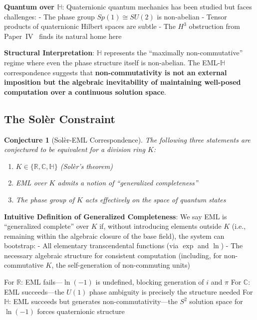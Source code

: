 \documentclass[11pt]{article}
\newtheorem{conjecture}[theorem]{Conjecture}
\providecommand{\tightlist}{%
  \setlength{\itemsep}{0pt}\setlength{\parskip}{0pt}}
\begin{document}
\textbf{Quantum over \(\mathbb{H}\)}: Quaternionic quantum mechanics has been studied but faces challenges: - The phase group \(Sp(1) \cong SU(2)\) is non-abelian - Tensor products of quaternionic Hilbert spaces are subtle - The \(H^3\) obstruction from Paper~IV~\cite{PaperIV} finds its natural home here

\textbf{Structural Interpretation}: \(\mathbb{H}\) represents the ``maximally non-commutative'' regime where even the phase structure itself is non-abelian. The EML-\(\mathbb{H}\) correspondence suggests that \textbf{non-commutativity is not an external imposition but the algebraic inevitability of maintaining well-posed computation over a continuous solution space}.

\subsection{The Solèr Constraint}
\label{sec:soler-constraint}

\begin{conjecture}[Sol\`{e}r-EML Correspondence]\label{conjecture:soler-eml}
The following three statements are conjectured to be equivalent for a division ring $K$:
\begin{enumerate}
\tightlist
\item $K \in \{\mathbb{R}, \mathbb{C}, \mathbb{H}\}$ (Sol\`{e}r's theorem)
\item EML over $K$ admits a notion of ``generalized completeness''
\item The phase group of $K$ acts effectively on the space of quantum states
\end{enumerate}
\end{conjecture}

\textbf{Intuitive Definition of Generalized Completeness}: We say EML is ``generalized complete'' over \(K\) if, without introducing elements outside \(K\) (i.e., remaining within the algebraic closure of the base field), the system can bootstrap: - All elementary transcendental functions (via \(\exp\) and \(\ln\)) - The necessary algebraic structure for consistent computation (including, for non-commutative \(K\), the self-generation of non-commuting units)

For $\mathbb{R}$: EML fails---\(\ln(-1)\) is undefined, blocking generation of \(i\) and \(\pi\) For $\mathbb{C}$: EML succeeds---the \(U(1)\) phase ambiguity is precisely the structure needed For $\mathbb{H}$: EML succeeds but generates non-commutativity---the \(S^2\) solution space for \(\ln(-1)\) forces quaternionic structure
\end{document}
